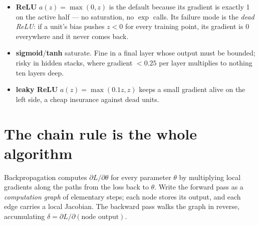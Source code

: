 \begin{itemize}
\item \textbf{ReLU} $a(z)=\max(0,z)$ is the default because
its gradient is exactly 1 on the active half --- no saturation, no
$\exp$ calls. Its failure mode is the \emph{dead ReLU}: if a unit's
bias pushes $z<0$ for every training point, its gradient is 0
everywhere and it never comes back.
\item \textbf{sigmoid}/\textbf{tanh} saturate. Fine in a final layer
whose output must be bounded; risky in hidden stacks, where gradient
$<0.25$ per layer multiplies to nothing ten layers deep.
\item \textbf{leaky ReLU} $a(z)=\max(0.1z,z)$ keeps a small gradient
alive on the left side, a cheap insurance against dead units.
\end{itemize}

\section{The chain rule is the whole algorithm}
\label{sec:chainrule}

Backpropagation computes $\partial L/\partial\theta$ for every
parameter $\theta$ by multiplying local gradients along the paths from
the loss back to $\theta$. Write the forward pass as a
\emph{computation graph} of elementary steps;
each node stores its output, and each edge carries a local Jacobian.
The backward pass walks the graph in reverse, accumulating
$\delta = \partial L/\partial(\text{node output})$.

